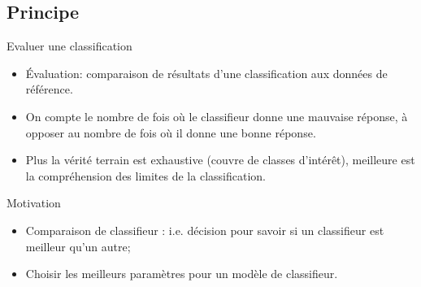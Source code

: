 \documentclass[8pt]{beamer}
\begin{document}
		\subsection{Principe}
			\begin{frame}{Evaluer une classification}
				\begin{itemize}
					\item<1-> Évaluation: comparaison de résultats d’une classification aux données de référence.
					\item<2-> On compte le nombre de fois où le classifieur donne une mauvaise réponse, à opposer au nombre de fois où il donne une bonne réponse.
					\item<3-> Plus la vérité terrain est exhaustive (couvre de classes d’intérêt), meilleure est la compréhension des limites de la classification.
				\end{itemize}
			\end{frame}
			\begin{frame}{Motivation}
				\begin{itemize}
					\item<1-> Comparaison de classifieur : i.e. décision pour savoir si un classifieur est meilleur qu’un autre;
					\item<2-> Choisir les meilleurs paramètres pour un modèle de classifieur.
				\end{itemize}
			\end{frame}
\end{document}

